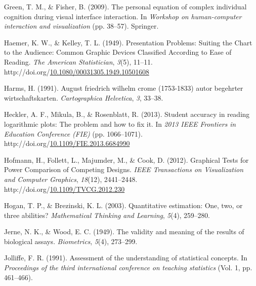 \documentclass[print]{nuthesis}
\newlength{\cslhangindent}
\newenvironment{CSLReferences}[2]%
{\setlength{\parindent}{0pt}%
\everypar{\setlength{\hangindent}{\cslhangindent}}\ignorespaces}%
{\par}
\begin{document}
\begin{CSLReferences}{1}{0}
\leavevmode{}%
Green, T. M., \& Fisher, B. (2009). The personal equation of complex individual cognition during visual interface interaction. In \emph{Workshop on human-computer interaction and visualization} (pp. 38--57). Springer.

\leavevmode{}%
Haemer, K. W., \& Kelley, T. L. (1949). Presentation {Problems}: {Suiting} the {Chart} to the {Audience}: {Common} {Graphic} {Devices} {Classified} {According} to {Ease} of {Reading}. \emph{The American Statistician}, \emph{3}(5), 11--11. http://doi.org/\href{https://doi.org/10.1080/00031305.1949.10501608}{10.1080/00031305.1949.10501608}

\leavevmode{}%
Harms, H. (1991). August friedrich wilhelm crome (1753-1833) autor begehrter wirtschaftskarten. \emph{Cartographica Helvetica}, \emph{3}, 33--38.

\leavevmode{}%
Heckler, A. F., Mikula, B., \& Rosenblatt, R. (2013). Student accuracy in reading logarithmic plots: {The} problem and how to fix it. In \emph{2013 {IEEE} {Frontiers} in {Education} {Conference} ({FIE})} (pp. 1066--1071). http://doi.org/\href{https://doi.org/10.1109/FIE.2013.6684990}{10.1109/FIE.2013.6684990}

\leavevmode{}%
Hofmann, H., Follett, L., Majumder, M., \& Cook, D. (2012). Graphical {Tests} for {Power} {Comparison} of {Competing} {Designs}. \emph{IEEE Transactions on Visualization and Computer Graphics}, \emph{18}(12), 2441--2448. http://doi.org/\href{https://doi.org/10.1109/TVCG.2012.230}{10.1109/TVCG.2012.230}

\leavevmode{}%
Hogan, T. P., \& Brezinski, K. L. (2003). Quantitative estimation: One, two, or three abilities? \emph{Mathematical Thinking and Learning}, \emph{5}(4), 259--280.

\leavevmode{}%
Jerne, N. K., \& Wood, E. C. (1949). The validity and meaning of the results of biological assays. \emph{Biometrics}, \emph{5}(4), 273--299.

\leavevmode{}%
Jolliffe, F. R. (1991). Assessment of the understanding of statistical concepts. In \emph{Proceedings of the third international conference on teaching statistics} (Vol. 1, pp. 461--466).


\end{CSLReferences}
\end{document}
